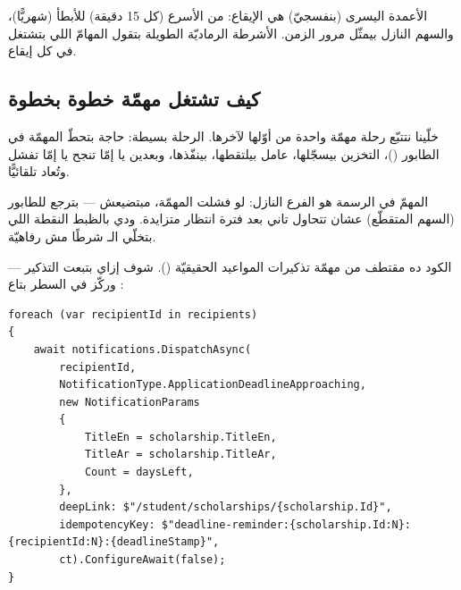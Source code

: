 الأعمدة اليسرى (بنفسجيّ) هي الإيقاع: من الأسرع (كل 15 دقيقة) للأبطأ (شهريًّا)، والسهم النازل
بيمثّل مرور الزمن. الأشرطة الرماديّة الطويلة بتقول المهامّ اللي بتشتغل في كل إيقاع.

\subsection{كيف تشتغل مهمّة خطوة بخطوة}

خلّينا نتتبّع رحلة مهمّة واحدة من أوّلها لآخرها. الرحلة بسيطة: حاجة بتحطّ المهمّة في الطابور
()، التخزين بيسجّلها، عامل بيلتقطها، بينفّذها، وبعدين يا إمّا تنجح يا إمّا تفشل
وتُعاد تلقائيًّا.

\begin{center}\begin{LTR}
\end{LTR}\end{center}

المهمّ في الرسمة هو الفرع النازل: لو فشلت المهمّة، مبتضيعش — بترجع للطابور (السهم المتقطّع)
عشان تتحاول تاني بعد فترة انتظار متزايدة. ودي بالظبط النقطة اللي بتخلّي الـ
شرطًا مش رفاهيّة.

الكود ده مقتطف من مهمّة تذكيرات المواعيد الحقيقيّة (). شوف إزاي
بتبعت التذكير — وركّز في السطر بتاع :

\begin{english}
\begin{lstlisting}[language={[Sharp]C}]
foreach (var recipientId in recipients)
{
    await notifications.DispatchAsync(
        recipientId,
        NotificationType.ApplicationDeadlineApproaching,
        new NotificationParams
        {
            TitleEn = scholarship.TitleEn,
            TitleAr = scholarship.TitleAr,
            Count = daysLeft,
        },
        deepLink: $"/student/scholarships/{scholarship.Id}",
        idempotencyKey: $"deadline-reminder:{scholarship.Id:N}:{recipientId:N}:{deadlineStamp}",
        ct).ConfigureAwait(false);
}
\end{lstlisting}
\end{english}

